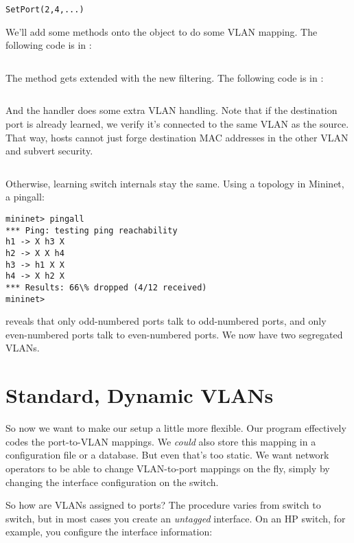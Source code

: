\begin{verbatim}
SetPort(2,4,...)
\end{verbatim}

We'll add some methods onto the  object to do some VLAN mapping.  The following
code is in :

\inputminted[firstline=60]{python}{code/handling_vlans/network_information_base_static.py}

The  method gets extended with the new filtering.  
The following
code is in :

\inputminted[firstline=23,lastline=30]{python}{code/handling_vlans/vlan1.py}

And the  handler does some extra VLAN handling.  Note that if the destination port is already
learned, we verify it's connected to the same VLAN as the source.  That way, hosts cannot just forge 
destination MAC addresses in the other VLAN and subvert security.  

\inputminted[firstline=43,lastline=73]{python}{code/handling_vlans/vlan1.py}

Otherwise, learning switch internals stay the same.  Using a  topology in Mininet,
a pingall:

\begin{verbatim}
mininet> pingall
*** Ping: testing ping reachability
h1 -> X h3 X
h2 -> X X h4
h3 -> h1 X X
h4 -> X h2 X
*** Results: 66\% dropped (4/12 received)
mininet>
\end{verbatim}

reveals that only odd-numbered ports talk to odd-numbered ports, and only even-numbered ports talk to
even-numbered ports.  We now have two segregated VLANs.

\section{Standard, Dynamic VLANs}

So now we want to make our setup a little more flexible.  Our program effectively codes the port-to-VLAN
mappings.  We \emph{could} also store this mapping in a configuration file or a database.  But even that's
too static.  We want network operators to be able to change VLAN-to-port mappings on the fly, simply
by changing the interface configuration on the switch.

So how are VLANs assigned to ports?  The procedure varies from switch to switch, but in most cases you
create an \emph{untagged} interface.  On an HP switch, for example, you configure the interface information:

